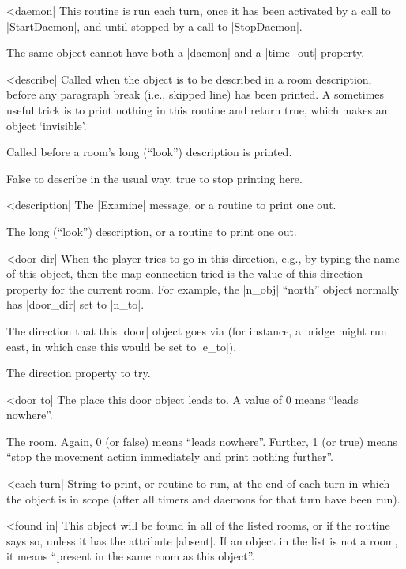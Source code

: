 {{{^^|daemon|
This routine is run each turn, once it has been activated by a
call to |StartDaemon|, and until stopped by a call to |StopDaemon|.

\warn The same object cannot have both a |daemon| and a |time_out|
property.

^^|describe|
\fo Called when the object is to be described in a room description,
before any paragraph break (i.e., skipped line) has been printed.  A
sometimes useful trick is to print nothing in this routine and return
true, which makes an object `invisible'.

\fr Called before a room's long (``look'') description is printed.

\rr False to describe in the usual way, true to stop printing here.

^^|description|
\fo The |Examine| message, or a routine to print one out.

\fr The long (``look'') description, or a routine to print one out.

\nrr

^^|door dir|
\fco When the player tries to go in this direction, e.g., by typing the
name of this object, then the map connection tried is the value of
this direction property for the current room.  For example, the
|n_obj| ``north'' object normally has |door_dir| set to |n_to|.

\fo The direction that this |door| object goes via (for instance,
a bridge might run east, in which case this would be set to |e_to|).

\rr The direction property to try.

^^|door to|
\fo The place this door object leads to.  A value of 0 means
``leads nowhere''.

\rr The room.  Again, 0 (or false) means ``leads nowhere''.
Further, 1 (or true) means ``stop the movement action immediately
and print nothing further''.

^^|each turn|
String to print, or routine to run, at the end of each turn in which
the object is in scope (after all timers and daemons for that turn have
been run).

\nrr

^^|found in|
This object will be found in all of the listed rooms, or if
the routine says so, unless it has the attribute |absent|.  If
an object in the list is not a room, it means ``present in the
same room as this object''.

}}}
